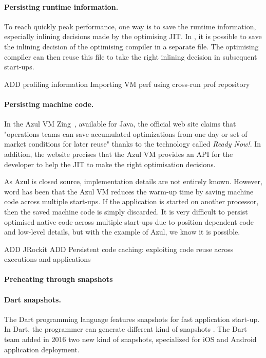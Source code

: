 \documentclass[a4paper,12pt,twoside]{../includes/ThesisStyle}
\begin{document}
\paragraph{Persisting runtime information.}

To reach quickly peak performance, one way is to save the runtime information, especially inlining decisions made by the optimising JIT. In 
 \cite{Sun06}, it is possible to save the inlining decision of the optimising compiler in a separate file. The optimising compiler can then reuse this file to take the right inlining decision in subsequent start-ups.


ADD
profiling information
Importing VM perf using cross-run prof repository \cite{Arno05c}

\paragraph{Persisting machine code.}

In the Azul VM Zing~\cite{Azul}, available for Java, the official web site claims that "operations teams can save accumulated optimizations from one day or set of market conditions for later reuse" thanks to the technology called \emph{Ready Now!}. In addition, the website precises that the Azul VM provides an API for the developer to help the JIT to make the right optimisation decisions. 

As Azul is closed source, implementation details are not entirely known. However, word has been that the Azul VM reduces the warm-up time by saving machine code across multiple start-ups. If the application is started on another processor, then the saved machine code is simply discarded. It is very difficult to persist optimised native code across multiple start-ups due to position dependent code and low-level details, but with the example of Azul, we know it is possible.

ADD 
JRockit\cite{JRockit}
ADD
Persistent code caching: exploiting code reuse across executions and applications
\cite{Redd07a}

\paragraph{Preheating through snapshots}

\paragraph{Dart snapshots.}
The Dart programming language features snapshots for fast application start-up. In Dart, the programmer can generate different kind of snapshots \cite{Anna13a}. The Dart team added in 2016 two new kind of snapshots, specialized for iOS and Android application deployment.
\end{document}
